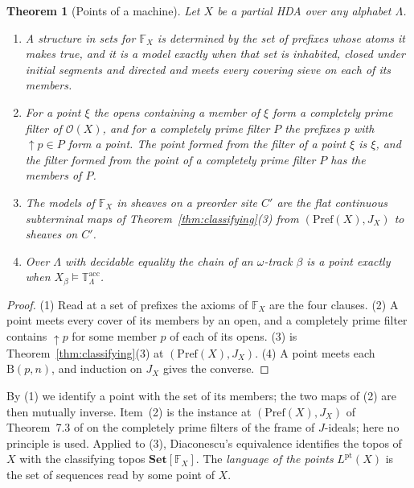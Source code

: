 \documentclass{lmcs}
\newtheorem{theorem}{Theorem}[section]
\theoremstyle{definition}
\theoremstyle{remark}
\newcommand{\Tt}{\mathbb{T}}
\newcommand{\Set}{\mathbf{Set}}
\newcommand{\Op}{\mathcal{O}}
\newcommand{\Clf}[1]{\Set[#1]}
\newcommand{\Pref}{\mathrm{Pref}}
\newcommand{\JX}[1]{J_{#1}}
\newcommand{\BB}{\mathrm{B}}
\newcommand{\upc}[1]{{\uparrow}#1}
\newcommand{\FX}[1]{\mathbb{F}_{#1}}
\providecommand{\LangPt}[1]{L^{\mathrm{pt}}(#1)}
\providecommand{\Tacc}{\Tt^{\mathrm{acc}}_{\Lambda}}
\begin{document}
\begin{theorem}[Points of a machine]\label{thm:pts-x}\label{prop:ct-points}
Let $X$ be a partial HDA over any alphabet $\Lambda$.
\begin{enumerate}
\item A structure in sets for $\FX{X}$ is determined by the set of prefixes whose atoms it makes
  true, and it is a model exactly when that set is inhabited, closed under initial
  segments and directed and meets every covering sieve on each of its
  members.
\item For a point $\xi$ the opens containing a member of $\xi$ form a completely prime filter of
  $\Op(X)$, and for a completely prime filter $P$ the prefixes $p$ with
  $\upc{p}\in P$ form a point. The point formed from the filter of a point $\xi$
  is $\xi$, and the filter formed from the point of a completely prime filter $P$
  has the members of $P$.
\item The models of $\FX{X}$ in sheaves on a preorder site $C'$ are the flat continuous subterminal maps of
  Theorem~\ref{thm:classifying}(3) from $(\Pref(X),\JX{X})$ to sheaves on $C'$.
\item Over $\Lambda$ with decidable equality the chain of an $\omega$-track $\beta$ is a point
  exactly when $X_\beta\models\Tacc$.
\end{enumerate}
\end{theorem}

\begin{proof}
(1) Read at a set of prefixes the axioms of $\FX{X}$ are the four
clauses. (2) A point meets every
cover of its members by an open, and a completely prime filter contains $\upc{p}$ for some member $p$ of each of its
opens.
(3) is Theorem~\ref{thm:classifying}(3) at
$(\Pref(X),\JX{X})$. (4) A point meets each $\BB(p,n)$, and induction on
$\JX{X}$ gives the converse.
\end{proof}

By (1) we identify a point with the set of its members; the two maps of (2) are then mutually inverse. Item~(2) is the
instance at $(\Pref(X),\JX{X})$ of Theorem~7.3 of \cite{Caramello11}
on the completely prime filters of the frame of $J$-ideals; here no principle is used. Applied to (3),
Diaconescu's equivalence \cite{Diaconescu75,CL25a} identifies the topos of
$X$ with the classifying topos $\Clf{\FX{X}}$. The \emph{language of the points} $\LangPt{X}$ is the set of
sequences read by some point of $X$.
\end{document}
